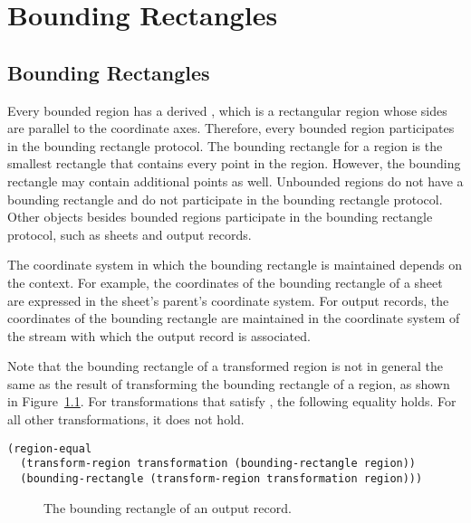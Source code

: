 
\chapter {Bounding Rectangles}
\label {bboxes}

\section {Bounding Rectangles}

Every bounded region has a derived , which is a
rectangular region whose sides are parallel to the coordinate axes.  Therefore,
every bounded region participates in the bounding rectangle protocol.  The
bounding rectangle for a region is the smallest rectangle that contains every
point in the region.  However, the bounding rectangle may contain additional
points as well.  Unbounded regions do not have a bounding rectangle and do not
participate in the bounding rectangle protocol.  Other objects besides bounded
regions participate in the bounding rectangle protocol, such as sheets and
output records.

The coordinate system in which the bounding rectangle is maintained depends on
the context.  For example, the coordinates of the bounding rectangle of a sheet
are expressed in the sheet's parent's coordinate system.  For output records,
the coordinates of the bounding rectangle are maintained in the coordinate
system of the stream with which the output record is associated.

Note that the bounding rectangle of a transformed region is not in general the
same as the result of transforming the bounding rectangle of a region, as shown
in Figure~\ref{output-record-bbox}.  For transformations that satisfy
, the following equality holds.  For all other
transformations, it does not hold.

\begin{verbatim}
(region-equal
  (transform-region transformation (bounding-rectangle region))
  (bounding-rectangle (transform-region transformation region)))
\end{verbatim}

\begin{figure}
\ifpsfig\centerline{}\else\vspace{2.0in}\fi
\caption{\label{output-record-bbox} The bounding rectangle of an output record.}
\end{figure}

